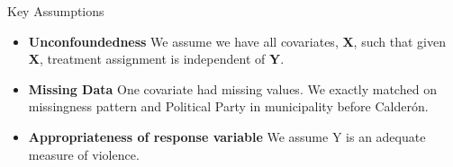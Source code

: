 \documentclass[final]{beamer}
\newlength{\onecolwid}
\begin{document}
\begin{frame}[t]
\begin{columns}[t]
\begin{column}{\onecolwid}
\begin{block}{Key Assumptions}
\begin{itemize}
\begin{itemize}
          \end{itemize}
        \item \textbf{Unconfoundedness} We assume we have all covariates, \textbf{X}, such that given \textbf{X},  treatment assignment is independent of \textbf{Y}.
        \item \textbf{Missing Data} One covariate had missing values. We exactly matched on missingness pattern and Political Party in municipality before Calder\'{o}n.
        \item \textbf{Appropriateness of response variable} We assume Y is an adequate measure of violence.	 %
        \end{itemize}
      \end{block}

    \end{column}


\end{columns}
\end{frame}
\end{document}
